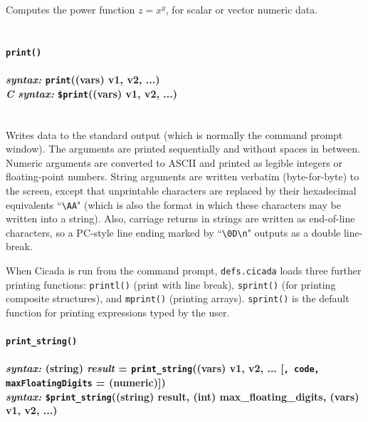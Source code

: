 \documentclass{article}
\begin{document}
Computes the power function $z = x^y$, for scalar or vector numeric data.\\\\




\paragraph{\texttt{print()}\\\\
\normalfont \emph{syntax: } \texttt{print}((vars) v1, v2, ...)\\
\normalfont \emph{C syntax: } \texttt{\$print}((vars) v1, v2, ...)\\\\}
 

Writes data to the standard output (which is normally the command prompt window).  The arguments are printed sequentially and without spaces in between.  Numeric arguments are converted to ASCII and printed as legible integers or floating-point numbers.  String arguments are written verbatim (byte-for-byte) to the screen, except that unprintable characters are replaced by their hexadecimal equivalents ``\verb$\AA$" (which is also the format in which these characters may be written into a string).  Also, carriage returns in strings are written as end-of-line characters, so a PC-style line ending marked by ``\verb$\0D\n$" outputs as a double line-break.

When Cicada is run from the command prompt, \verb#defs.cicada# loads three further printing functions:  \verb#printl()# (print with line break), \verb#sprint()# (for printing composite structures), and \verb#mprint()# (printing arrays).  \verb#sprint()# is the default function for printing expressions typed by the user.\\

 




\paragraph{\texttt{print\_string()}\\\\
\normalfont \emph{syntax: } (string) \emph{result} = \texttt{print\_string}((vars) v1, v2, ... [\texttt{, code, maxFloatingDigits} = (numeric)])\\
\normalfont \emph{syntax: } \texttt{\$print\_string}((string) result, (int) max\_floating\_digits, (vars) v1, v2, ...)\\\\}
  
\end{document}
